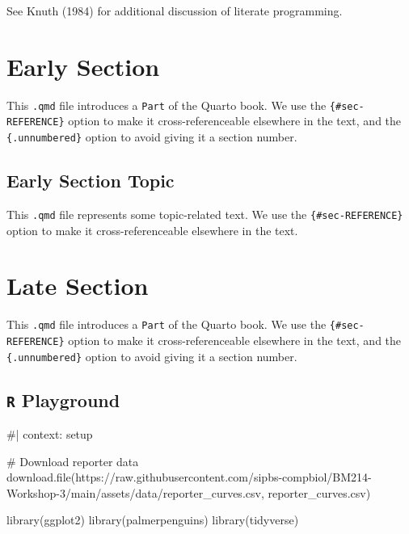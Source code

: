 \documentclass[
  letterpaper,
  DIV=11,
  numbers=noendperiod]{scrreprt}
\newenvironment{Shaded}{\begin{snugshade}}{\end{snugshade}}
\newcommand{\NormalTok}[1]{\textcolor[rgb]{0.00,0.23,0.31}{#1}}
\begin{document}
See Knuth (1984) for additional discussion of literate programming.

\part{Early Section}

This \texttt{.qmd} file introduces a \texttt{Part} of the Quarto book.
We use the \texttt{\{\#sec-REFERENCE\}} option to make it
cross-referenceable elsewhere in the text, and the
\texttt{\{.unnumbered\}} option to avoid giving it a section number.

\chapter{Early Section Topic}\label{sec-early-topic}

This \texttt{.qmd} file represents some topic-related text. We use the
\texttt{\{\#sec-REFERENCE\}} option to make it cross-referenceable
elsewhere in the text.

\part{Late Section}

This \texttt{.qmd} file introduces a \texttt{Part} of the Quarto book.
We use the \texttt{\{\#sec-REFERENCE\}} option to make it
cross-referenceable elsewhere in the text, and the
\texttt{\{.unnumbered\}} option to avoid giving it a section number.

\chapter{\texorpdfstring{\texttt{R}
Playground}{R Playground}}\label{r-playground}

\begin{Shaded}
\begin{Highlighting}[]
\NormalTok{\#| context: setup}

\NormalTok{\# Download reporter data}
\NormalTok{download.file(\textquotesingle{}https://raw.githubusercontent.com/sipbs{-}compbiol/BM214{-}Workshop{-}3/main/assets/data/reporter\_curves.csv\textquotesingle{}, \textquotesingle{}reporter\_curves.csv\textquotesingle{})}

\NormalTok{library(ggplot2)}
\NormalTok{library(palmerpenguins)}
\NormalTok{library(tidyverse)}
\end{Highlighting}
\end{Shaded}
\end{document}
